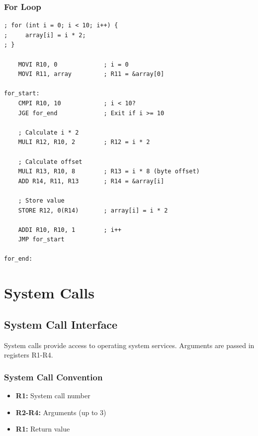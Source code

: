 \documentclass[12pt,a4paper,oneside]{book}
\begin{document}
\subsection{For Loop}

\begin{lstlisting}[style=assembly, caption={For Loop}]
; for (int i = 0; i < 10; i++) {
;     array[i] = i * 2;
; }

    MOVI R10, 0             ; i = 0
    MOVI R11, array         ; R11 = &array[0]
    
for_start:
    CMPI R10, 10            ; i < 10?
    JGE for_end             ; Exit if i >= 10
    
    ; Calculate i * 2
    MULI R12, R10, 2        ; R12 = i * 2
    
    ; Calculate offset
    MULI R13, R10, 8        ; R13 = i * 8 (byte offset)
    ADD R14, R11, R13       ; R14 = &array[i]
    
    ; Store value
    STORE R12, 0(R14)       ; array[i] = i * 2
    
    ADDI R10, R10, 1        ; i++
    JMP for_start
    
for_end:
\end{lstlisting}

\chapter{System Calls}

\section{System Call Interface}

System calls provide access to operating system services. Arguments are passed in registers R1-R4.

\subsection{System Call Convention}

\begin{itemize}
    \item \textbf{R1:} System call number
    \item \textbf{R2-R4:} Arguments (up to 3)
    \item \textbf{R1:} Return value
\end{itemize}
\end{document}
